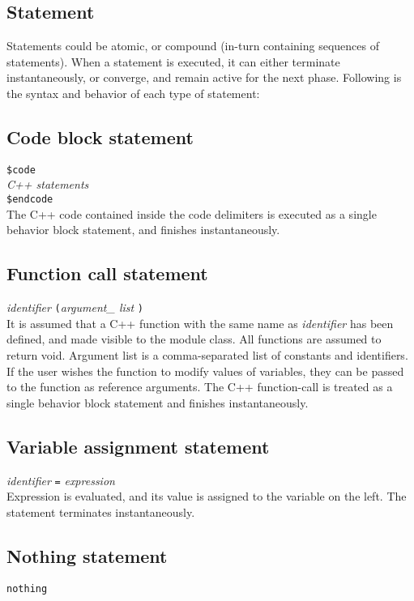 	\subsection{Statement}
	Statements could be atomic, or compound (in-turn containing sequences of statements).
	When a statement is executed, it can either terminate instantaneously,
	or converge, and remain active for the next phase.
	Following is the syntax and behavior of each type of statement:\\

	\subsection{Code block statement}
		\texttt{\$code}\\
		\textit{C++ statements}\\
		\texttt{\$endcode}\\

	The C++ code contained inside the code delimiters is executed 
	as a single behavior block statement, and finishes instantaneously.


	\subsection{Function call statement}
		\textit{identifier} \texttt{(}\textit{argument\_ list} \texttt{)}\\

	It is assumed that a C++ function with the same name as \textit{identifier}
	has been defined, and made visible to the module class. All
	functions are assumed to return void.
	Argument list is a comma-separated list of constants and identifiers.
	If the user wishes the function to modify values of variables, they can
	be passed to the function as reference arguments.
	The C++ function-call is treated as a single behavior block statement 
	and finishes instantaneously.


	\subsection{Variable assignment statement}
		\textit{identifier} \texttt{=} \textit{expression}\\

	Expression is evaluated, and its value is assigned to the variable on the left.
	The statement terminates instantaneously.


	\subsection{Nothing statement}
		\texttt{nothing}\\

